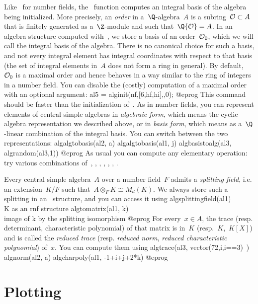 Like~ for number fields, the~ function computes an
integral basis of
the algebra being initialized. More precisely, an \emph{order} in
a~$\Q$-algebra~$A$ is a subring~${\cal O}\subset A$ that is finitely generated
as a~$\Z$-module and such that~$\Q{\cal O} = A$. In an algebra
structure
computed with~, we store a basis of an order~${\cal O}_0$, which we
will call the integral basis of the algebra. There is no canonical choice for
such a basis, and not every integral element has integral coordinates with
respect to that basis (the set of integral elements in~$A$ does not form a
ring in general). By default, ${\cal O}_0$ is a maximal order and hence behaves
in a way similar to the ring of integers in a number field. You can disable the
(costly) computation of a maximal order with an optional argument:
\bprog
al5 = alginit(nf,[6,hf,hi],,0);
@eprog\noindent
This command should be faster than the initialization of~.
As in number fields, you can represent elements of central simple algebras in
\emph{algebraic form}, which means the cyclic algebra representation we
described above, or in \emph{basis form}, which means as a~$\Q$-linear
combination of the integral basis. You can switch between the two
representations:
\bprog
algalgtobasis(al2, a)
algalgtobasis(al1, j)
algbasistoalg(al3, algrandom(al3,1))
@eprog\noindent
As usual you can compute any elementary operation: try various combinations
of~, , , , ,
, .

Every central simple algebra~$A$ over a number field~$F$ admits a \emph{splitting
field}, i.e. an extension~$K/F$ such that~$A\otimes_F K\cong M_d(K)$. We always
store such a splitting in an~ structure, and you can access it
using
\bprog
algsplittingfield(al1) \\ K as an rnf structure
algtomatrix(al1, k) \\ image of k by the splitting isomorphism
@eprog\noindent
For every~$x\in A$, the trace (resp. determinant, characteristic polynomial)
of that matrix is in~$K$ (resp.~$K$,~$K[X]$) and is called the
\emph{reduced trace} (resp. \emph{reduced norm}, \emph{reduced characteristic
polynomial}) of~$x$. You can compute them using
\bprog
algtrace(al3, vector(72,i,i==3)~)
algnorm(al2, a)
algcharpoly(al1, -1+i+j+2*k)
@eprog

\section{Plotting}

